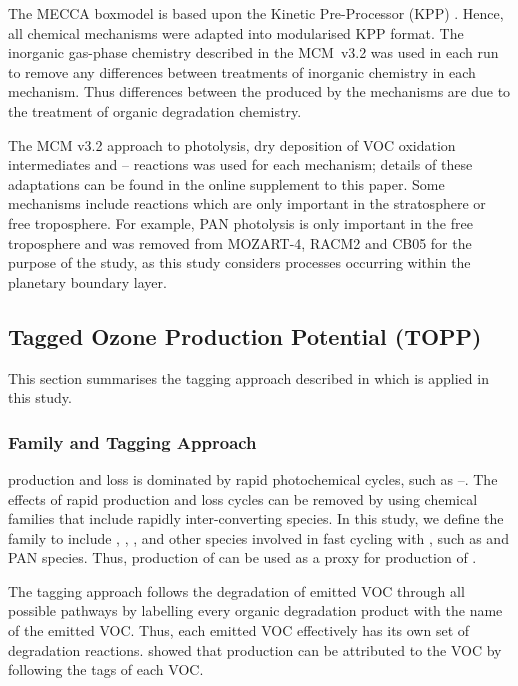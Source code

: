 The MECCA boxmodel is based upon the Kinetic Pre-Processor (KPP) \citep{Damian:2002}.
Hence, all chemical mechanisms were adapted into modularised KPP format.
The inorganic gas-phase chemistry described in the \mbox{MCM v3.2} was used in each run to remove any differences between treatments of inorganic chemistry in each mechanism.
Thus differences between the  produced by the mechanisms are due to the treatment of organic degradation chemistry.

The MCM v3.2 approach to photolysis, dry deposition of VOC oxidation intermediates and -- reactions was used for each mechanism; details of these adaptations can be found in the online supplement to this paper.
Some mechanisms include reactions which are only important in the stratosphere or free troposphere.
For example, PAN photolysis is only important in the free troposphere \citep{Harwood:2003} and was removed from MOZART-4, RACM2 and CB05 for the purpose of the study, as this study considers processes occurring within the planetary boundary layer.

\subsection{Tagged Ozone Production Potential (TOPP)}
This section summarises the tagging approach described in \citet{Butler:2011} which is applied in this study.

\subsubsection[Ox Family and Tagging Approach]{ Family and Tagging Approach} \label{ss:tagging} %
%
 production and loss is dominated by rapid photochemical cycles, such as --.
The effects of rapid production and loss cycles can be removed by using chemical families that include rapidly inter-converting species.
In this study, we define the  family to include , , ,  and other species involved in fast cycling with , such as  and PAN species.
Thus, production of  can be used as a proxy for production of .

The tagging approach follows the degradation of emitted VOC through all possible pathways by labelling every organic degradation product with the name of the emitted VOC.
Thus, each emitted VOC effectively has its own set of degradation reactions.
\citet{Butler:2011} showed that  production can be attributed to the VOC by following the tags of each VOC.

